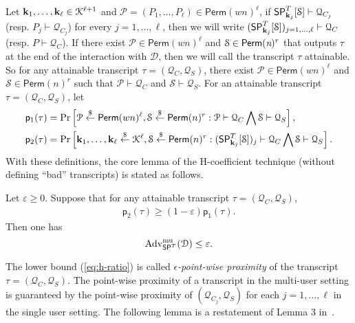 Let $\mathbf{k}_1, \ldots ,\mathbf{k}_{\ell} \in \mathcal{K}^{\ell+1}$ and ${\mathcal{P}} = ({P}_1, \ldots ,{P}_\ell) \in {\mathsf{Perm}}(wn)^\ell$, if $\mathsf{SP}_{\mathbf{k}_j}^T[\mathcal{S}]\vdash\mathcal{Q}_{C_j}$ (resp. ${P}_j\vdash\mathcal{Q}_{C_j}$) for every $j = 1, \ldots ,\ell$, then we will write $(\mathsf{SP}_{\mathbf{k}_j}^{T}[\mathcal{S}])_{j = 1, \ldots ,\ell} \vdash \mathcal{Q}_C$ (resp. ${P}\vdash\mathcal{Q}_{C}$).
%
If there exist ${\mathcal{P}} \in {\mathsf{Perm}}(wn)^\ell$ and $\mathcal{S} \in \mathsf{Perm}(\emph{n})^r$ that outputs $\tau$ at the end of the interaction with $\mathcal{D}$, then we will call the transcript $\tau$ attainable. So for any attainable transcript $\tau= (\mathcal{Q}_C,\mathcal{Q}_S)$, there exist ${\mathcal{P}} \in {\mathsf{Perm}}(wn)^\ell$ and $\mathcal{S} \in \mathsf{Perm}(n)^r$ such that ${\mathcal{P}}\vdash\mathcal{Q}_C$ and $\mathcal{S}\vdash\mathcal{Q}_S$. For an attainable transcript $\tau = (\mathcal{Q}_C,\mathcal{Q}_S)$, let
%
%
$$
\begin{aligned}
&\mathsf{p}_{1}(\tau)=\operatorname{Pr}\left[{\mathcal{P}} \stackrel{\$}{\leftarrow} {{\mathsf{Perm}}}(wn)^{\ell}, \mathcal{S} \stackrel{\$}{\leftarrow} \mathsf{Perm}(n)^{r}: {\mathcal{P}} \vdash \mathcal{Q}_{C} \bigwedge \mathcal{S} \vdash \mathcal{Q}_{S}\right],\\
&\mathsf{p}_{2}(\tau)=\operatorname{Pr}\left[\mathbf{k}_{1}, \ldots, \mathbf{k}_{\ell} \stackrel{\$}{\leftarrow} \mathcal{K}^{\ell}, \mathcal{S} \stackrel{\$}{\leftarrow} \mathsf{Perm}(n)^{r}:(\mathsf{SP}_{\mathbf{k}_{j}}^{T}[\mathcal{S}])_{j} \vdash \mathcal{Q}_{C} \bigwedge \mathcal{S} \vdash \mathcal{Q}_{S}\right].
\end{aligned}
$$
%
%
With these definitions, the core lemma of the H-coefficient technique (without defining ``bad'' transcripts) is stated as follows.


\begin{lemma}
	\label{lemma:h-coeff}
	
	Let $\varepsilon \geq 0$. Suppose that for any attainable transcript $\tau = (\mathcal{Q}_C,\mathcal{Q}_S)$,
	\begin{align}
	\mathsf{p}_{2}(\tau) \geq (1 - \varepsilon) \mathsf{p}_{1}(\tau).
	\label{eq:h-ratio}
	\end{align}
	Then one has
	$$
	\operatorname{Adv}^{\mathrm{mu}}_{\mathsf{SP}^T}(\mathcal{D}) \leq \varepsilon.
	$$
\end{lemma}
%
%
The lower bound (\ref{eq:h-ratio}) is called \emph{$\epsilon$-point-wise proximity} of the transcript $\tau = (\mathcal{Q}_C, \mathcal{Q}_S)$. The point-wise proximity of a transcript in the multi-user setting is guaranteed by the point-wise proximity of $(\mathcal{Q}_{C_{j}}, \mathcal{Q}_S)$ for each $j = 1, \ldots ,\ell$ in the single user setting. The following lemma is a restatement of Lemma 3 in~\cite{C:HoaTes16}.


